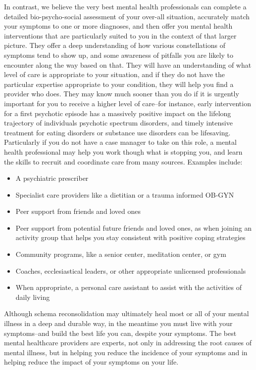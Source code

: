 \documentclass[12pt,letterpaper]{book}
\begin{document}
In contrast, we believe the very best mental health professionals can complete a detailed bio-psycho-social assessment of your over-all situation, accurately match your symptoms to one or more diagnoses, and then offer you mental health interventions that are particularly suited to you in the context of that larger picture. They offer a deep understanding of how various constellations of symptoms tend to show up, and some awareness of pitfalls you are likely to encounter along the way based on that. They will have an understanding of what level of care is appropriate to your situation, and if they do not have the particular expertise appropriate to your condition, they will help you find a provider who does. They may know much sooner than you do if it is urgently important for you to receive a higher level of care–for instance, early intervention for a first psychotic episode has a massively positive impact on the lifelong trajectory of individuals psychotic spectrum disorders, and timely intensive treatment for eating disorders or substance use disorders can be lifesaving. Particularly if you do not have a case manager to take on this role, a mental health professional may help you work though what is stopping you, and learn the skills to recruit and coordinate care from many sources. Examples include:
\begin{itemize}
    \item A psychiatric prescriber 
    \item Specialist care providers like a dietitian or a trauma informed OB-GYN
    \item Peer support from friends and loved ones
    \item Peer support from potential future friends and loved ones, as when joining an activity group that helps you stay consistent with positive coping strategies
    \item Community programs, like a senior center, meditation center, or gym
    \item Coaches, ecclesiastical leaders, or other appropriate unlicensed professionals
    \item When appropriate, a personal care assistant to assist with the activities of daily living
\end{itemize}
Although schema reconsolidation may ultimately heal most or all of your mental illness in a deep and durable way, in the meantime you must live with your symptoms–and build the best life you can, despite your symptoms. The best mental healthcare providers are experts, not only in addressing the root causes of mental illness, but in helping you reduce the incidence of your symptoms and in helping reduce the impact of your symptoms on your life. 
\end{document}
